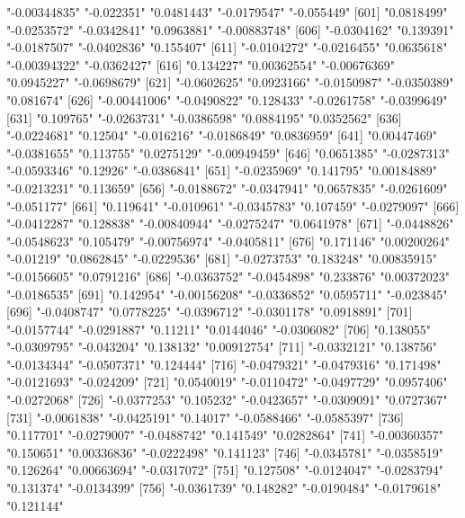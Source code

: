 \begin{Schunk}
\begin{Soutput}
[596] "-0.00344835"  "-0.022351"    "0.0481443"    "-0.0179547"   "-0.055449"   
[601] "0.0818499"    "-0.0253572"   "-0.0342841"   "0.0963881"    "-0.00883748" 
[606] "-0.0304162"   "0.139391"     "-0.0187507"   "-0.0402836"   "0.155407"    
[611] "-0.0104272"   "-0.0216455"   "0.0635618"    "-0.00394322"  "-0.0362427"  
[616] "0.134227"     "0.00362554"   "-0.00676369"  "0.0945227"    "-0.0698679"  
[621] "-0.0602625"   "0.0923166"    "-0.0150987"   "-0.0350389"   "0.081674"    
[626] "-0.00441006"  "-0.0490822"   "0.128433"     "-0.0261758"   "-0.0399649"  
[631] "0.109765"     "-0.0263731"   "-0.0386598"   "0.0884195"    "0.0352562"   
[636] "-0.0224681"   "0.12504"      "-0.016216"    "-0.0186849"   "0.0836959"   
[641] "0.00447469"   "-0.0381655"   "0.113755"     "0.0275129"    "-0.00949459" 
[646] "0.0651385"    "-0.0287313"   "-0.0593346"   "0.12926"      "-0.0386841"  
[651] "-0.0235969"   "0.141795"     "0.00184889"   "-0.0213231"   "0.113659"    
[656] "-0.0188672"   "-0.0347941"   "0.0657835"    "-0.0261609"   "-0.051177"   
[661] "0.119641"     "-0.010961"    "-0.0345783"   "0.107459"     "-0.0279097"  
[666] "-0.0412287"   "0.128838"     "-0.00840944"  "-0.0275247"   "0.0641978"   
[671] "-0.0448826"   "-0.0548623"   "0.105479"     "-0.00756974"  "-0.0405811"  
[676] "0.171146"     "0.00200264"   "-0.01219"     "0.0862845"    "-0.0229536"  
[681] "-0.0273753"   "0.183248"     "0.00835915"   "-0.0156605"   "0.0791216"   
[686] "-0.0363752"   "-0.0454898"   "0.233876"     "0.00372023"   "-0.0186535"  
[691] "0.142954"     "-0.00156208"  "-0.0336852"   "0.0595711"    "-0.023845"   
[696] "-0.0408747"   "0.0778225"    "-0.0396712"   "-0.0301178"   "0.0918891"   
[701] "-0.0157744"   "-0.0291887"   "0.11211"      "0.0144046"    "-0.0306082"  
[706] "0.138055"     "-0.0309795"   "-0.043204"    "0.138132"     "0.00912754"  
[711] "-0.0332121"   "0.138756"     "-0.0134344"   "-0.0507371"   "0.124444"    
[716] "-0.0479321"   "-0.0479316"   "0.171498"     "-0.0121693"   "-0.024209"   
[721] "0.0540019"    "-0.0110472"   "-0.0497729"   "0.0957406"    "-0.0272068"  
[726] "-0.0377253"   "0.105232"     "-0.0423657"   "-0.0309091"   "0.0727367"   
[731] "-0.0061838"   "-0.0425191"   "0.14017"      "-0.0588466"   "-0.0585397"  
[736] "0.117701"     "-0.0279007"   "-0.0488742"   "0.141549"     "0.0282864"   
[741] "-0.00360357"  "0.150651"     "0.00336836"   "-0.0222498"   "0.141123"    
[746] "-0.0345781"   "-0.0358519"   "0.126264"     "0.00663694"   "-0.0317072"  
[751] "0.127508"     "-0.0124047"   "-0.0283794"   "0.131374"     "-0.0134399"  
[756] "-0.0361739"   "0.148282"     "-0.0190484"   "-0.0179618"   "0.121144"    

\end{Soutput}
\end{Schunk}
